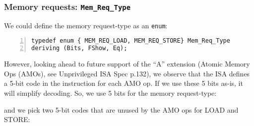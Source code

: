 
\begin{frame}[fragile]
\frametitle{Memory requests: {\tt Mem\_Req\_Type}}

\footnotesize

We could define the memory request-type as an {\tt enum}:
\begin{Verbatim}[frame=single, numbers=left]
typedef enum { MEM_REQ_LOAD, MEM_REQ_STORE} Mem_Req_Type
deriving (Bits, FShow, Eq);
\end{Verbatim}

However, looking ahead to future support of the ``A'' extension
(Atomic Memory Ops (AMOs), see Unprivileged ISA Spec p.132), we
observe that the ISA defines a 5-bit code in the instruction for each
AMO op.  If we use these 5 bits as-is, it will simplify decoding.  So,
we use 5 bits for the memory request-type:

\vspace{2ex}


\vspace{4ex}
and we pick two 5-bit codes that are unused by the AMO ops for LOAD and STORE:

\vspace{2ex}


\end{frame}


